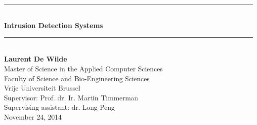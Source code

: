 \documentclass[11pt, a4paper,svgnames]{report}
\newcommand{\HRule}{\rule{\linewidth}{0.5mm}}
\begin{document}
\begin{titlepage}
\begin{center}
~\vspace{70mm}

\HRule \\[0.4cm]
{ \huge \bfseries Intrusion Detection Systems \\[0.4cm] }
\HRule \\[1.0cm]
\Large \textbf{Laurent De Wilde}\\Master of Science in the Applied Computer Sciences\\Faculty of Science and Bio-Engineering Sciences\\Vrije Universiteit Brussel\\
\vspace{10 mm}
\Large Supervisor: Prof. dr. Ir. Martin Timmerman \\
\vspace{5 mm}
\large Supervising assistant: dr. Long Peng \\
\vspace{10 mm}
\large November 24, 2014
\end{center}
\end{titlepage}
\renewcommand{\mtctitle}{Chapter contents}



\dominitoc
\tableofcontents

\setcounter{mtc}{1}


\setcounter{mtc}{2}


\setcounter{mtc}{3}


\setcounter{mtc}{4}


\setcounter{mtc}{5}


\newpage


\end{document}
